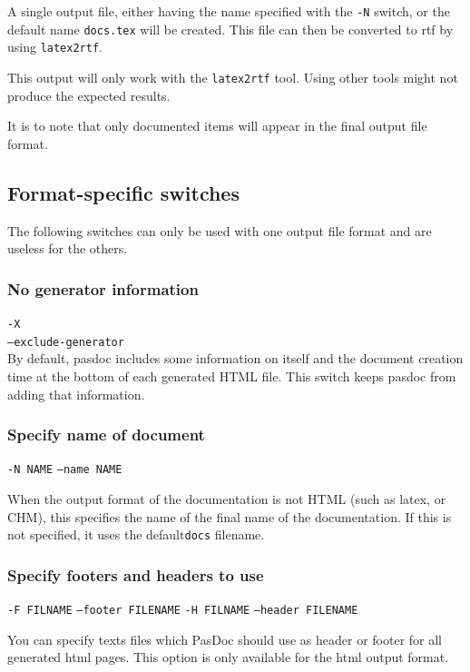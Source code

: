 \documentclass[11pt]{article}
\begin{document}
A single output file, either having the name specified with
the {\tt -N} switch, or the default name {\tt docs.tex} will
be created. This file can then be converted to rtf by using
{\tt latex2rtf}.

This output will only work with the {\tt latex2rtf} tool. Using
other tools might not produce the expected results.

It is to note that only documented items will appear in the final
output file format.


\subsection{Format-specific switches}

The following switches can only be used with one output file format
and are useless for the others.

\subsubsection{No generator information}

{\tt -X}\\
{\tt --exclude-generator}\\

By default, pasdoc includes some information on itself and the document
creation time at the bottom of each generated HTML file.
This switch keeps pasdoc from adding that information.

\subsubsection{Specify name of document}
{\tt -N NAME}
{\tt --name NAME}

When the output format of the documentation is not
HTML (such as latex, or CHM), this specifies the
name of the final name of the documentation. If this
is not specified, it uses the default{\tt  docs}
filename.



\subsubsection{Specify footers and headers to use}

{\tt -F FILNAME}
{\tt --footer FILENAME}
{\tt -H FILNAME}
{\tt --header FILENAME}

You can specify texts files which PasDoc should use as header or footer
for all generated html pages. This option is only available for
the html output format.
\end{document}
